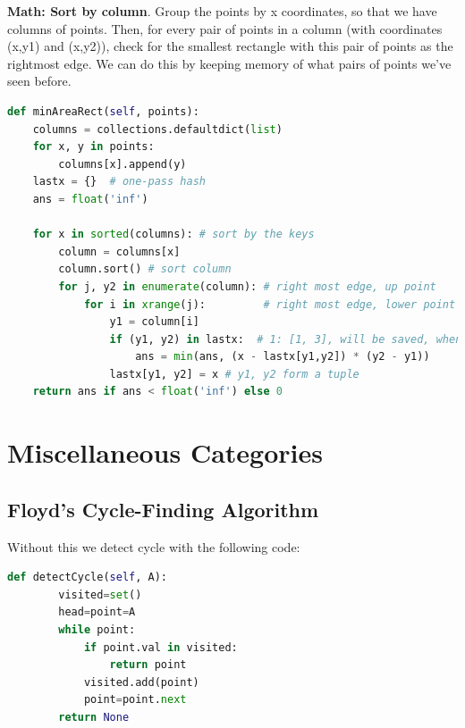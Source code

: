 \documentclass[../main.tex]{subfiles}
\begin{document}
\textbf{Math: Sort by column}. Group the points by x coordinates, so that we have columns of points. Then, for every pair of points in a column (with coordinates (x,y1) and (x,y2)), check for the smallest rectangle with this pair of points as the rightmost edge. We can do this by keeping memory of what pairs of points we've seen before.
\begin{lstlisting}[language=Python]
def minAreaRect(self, points):
    columns = collections.defaultdict(list)
    for x, y in points:
        columns[x].append(y)
    lastx = {}  # one-pass hash
    ans = float('inf')

    for x in sorted(columns): # sort by the keys
        column = columns[x]
        column.sort() # sort column
        for j, y2 in enumerate(column): # right most edge, up point
            for i in xrange(j):         # right most edge, lower point
                y1 = column[i]
                if (y1, y2) in lastx:  # 1: [1, 3], will be saved, when we were at 3: [1, 3], we can get the answer
                    ans = min(ans, (x - lastx[y1,y2]) * (y2 - y1))
                lastx[y1, y2] = x # y1, y2 form a tuple
    return ans if ans < float('inf') else 0
\end{lstlisting}

\section{Miscellaneous Categories}
\subsection{Floyd’s Cycle-Finding Algorithm}

Without this we detect cycle with the following code:
\begin{lstlisting}[language = Python]
def detectCycle(self, A):
        visited=set()       
        head=point=A
        while point:
            if point.val in visited:
                return point
            visited.add(point)
            point=point.next
        return None
\end{lstlisting}
\end{document}
